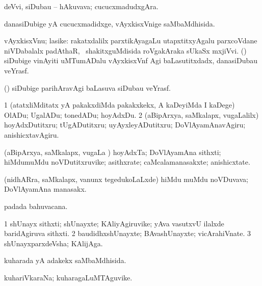 \bentry
{} 
\gl{\nA}
\expl{}
\bmng
 deVvi, siDubau -- hAkuvava; cucucxmadudxgAra. 
\emng
\eentry

\bentry
{} 
\gl{\gu}
\expl{}
\bmng
 danasiDubige yA cucucxmadidxge, vAyxkisxVnige saMbaMdhisida. 
\emng
\eentry

\bentry 
{} 
\gl{\nA}
\expl{}
\bmng
vAyxkisxVnu; lasike: 
\banum
{} rakatxdalilx parxtikAyagaLu utapxtitxyAgalu parxcoVdane niVDabalalx padAthaR, \sA\ shakitxguMdisida roVgakAraka sUkaSx mxjiVvi. 
 (\ca) siDubige vinAyiti uMTumADalu vAyxkisxVnf Agi baLasutitxdadx, danasiDubau veYrasf. 
\eanum
\emng
\eentry

\bentry
{} 
\gl{\nA}
\bmng
 (\veYshA) siDubige parihAravAgi baLasuva siDubau veYrasf. 
\emng
\eentry

\bentry
{} 
\gl{\akirx}
\expl{}
\bmng
\bnum
\num{1} (atatxliMditatx yA pakakxdiMda pakakxkekx, A kaDeyiMda I kaDege) OlADu; UgalADu; tonedADu; hoyAdxDu. 
\num{2} (aBipArxya, saMkalapx, \mo vugaLalilx) hoyAdxDutitxru; tUgADutitxru; uyAyxleyADutitxru; DoVlAyamAnavAgiru; anishicxtavAgiru. 
\enum
\emng
\eentry

\bentry
{} 
\gl{\nA}
\expl{}
\bmng
 (aBipArxya, saMkalapx, \mo vugaLa \vi) hoyAdxTa; DoVlAyamAna sithxti; hiMdumuMdu noVDutitxruvike; asithxrate; caMcalamanasakxte; anishicxtate. 
\emng
\eentry

\bentry
{} 
\gl{\nA}
\expl{}
\bmng
 (nidhARra, saMkalapx, \mo vanunx tegedukoLaLxde) hiMdu muMdu noVDuvava; DoVlAyamAna manasakx. 
\emng
\eentry

\bentry
{} 
\gl{\nA}
\expl{}
\bmng
  padada bahuvacana. 
\emng
\eentry

\bentry
{} 
\gl{\nA}
\bmng
\bnum
\num{1} shUnayx sithxti; shUnayxte; KAliyAgiruvike; yAva vasutxvU ilalxde baridAgiruva sithxti. 
\num{2} baudidhxshUnayxte; BAvashUnayxte; vicArahiVnate. 
\num{3} shUnayxparxdeVsha; KAlijAga. 
\enum
\emng
\eentry

\bentry
{} 
\gl{\gu}
\expl{}
\bmng
 kuharada yA adakekx saMbaMdhisida. 
\emng
\eentry

\bentry
{} 
\gl{\nA}
\expl{}
\bmng
 kuhariVkaraNa; kuharagaLuMTAguvike. 
\emng
\eentry

